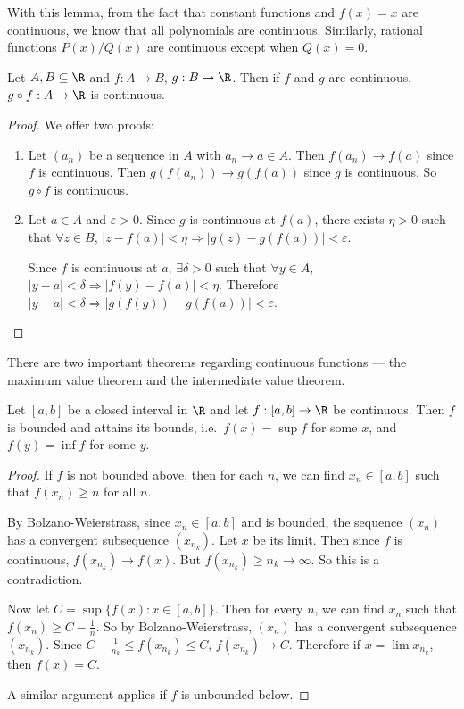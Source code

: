 \documentclass[a4paper]{article}
\begin{document}
With this lemma, from the fact that constant functions and $f(x) = x$ are continuous, we know that all polynomials are continuous. Similarly, rational functions $P(x)/Q(x)$ are continuous except when $Q(x) = 0$.

\begin{lemma}
  Let $A, B\subseteq \R$ and $f: A\to B$, $g: B\to \R$. Then if $f$ and $g$ are continuous, $g\circ f: A\to \R$ is continuous.
\end{lemma}

\begin{proof}
  We offer two proofs:
  \begin{enumerate}
    \item Let $(a_n)$ be a sequence in $A$ with $a_n \to a\in A$. Then $f(a_n) \to f(a)$ since $f$ is continuous. Then $g(f(a_n)) \to g(f(a))$ since $g$ is continuous. So $g\circ f$ is continuous.
    \item Let $a\in A$ and $\varepsilon > 0$. Since $g$ is continuous at $f(a)$, there exists $\eta > 0$ such that $\forall z\in B$, $|z - f(a)| < \eta \Rightarrow |g(z) - g(f(a))| < \varepsilon$.

      Since $f$ is continuous at $a$, $\exists \delta > 0$ such that $\forall y\in A$, $|y - a| < \delta \Rightarrow |f(y) - f(a)| < \eta$. Therefore $|y - a| < \delta \Rightarrow |g(f(y)) - g(f(a))| < \varepsilon$.\qedhere
  \end{enumerate}
\end{proof}

There are two important theorems regarding continuous functions --- the maximum value theorem and the intermediate value theorem.
\begin{thm}
  Let $[a, b]$ be a closed interval in $\R$ and let $f: [a, b] \to \R$ be continuous. Then $f$ is bounded and attains its bounds, i.e.\ $f(x) = \sup f$ for some $x$, and $f(y) = \inf f$ for some $y$.
\end{thm}

\begin{proof}
  If $f$ is not bounded above, then for each $n$, we can find $x_n\in [a, b]$ such that $f(x_n) \geq n$ for all $n$.

  By Bolzano-Weierstrass, since $x_n \in [a, b]$ and is bounded, the sequence $(x_n)$ has a convergent subsequence $(x_{n_k})$. Let $x$ be its limit. Then since $f$ is continuous, $f(x_{n_k}) \to f(x)$. But $f(x_{n_k}) \geq n_k \to \infty$. So this is a contradiction.

  Now let $C = \sup\{f(x): x\in [a, b]\}$. Then for every $n$, we can find $x_n$ such that $f(x_n) \geq C - \frac{1}{n}$. So by Bolzano-Weierstrass, $(x_n)$ has a convergent subsequence $(x_{n_k})$. Since $C - \frac{1}{n_{k}}\leq f(x_{n_k}) \leq C$, $f(x_{n_k})\to C$. Therefore if $x = \lim x_{n_k}$, then $f(x) = C$.

  A similar argument applies if $f$ is unbounded below.
\end{proof}
\end{document}
